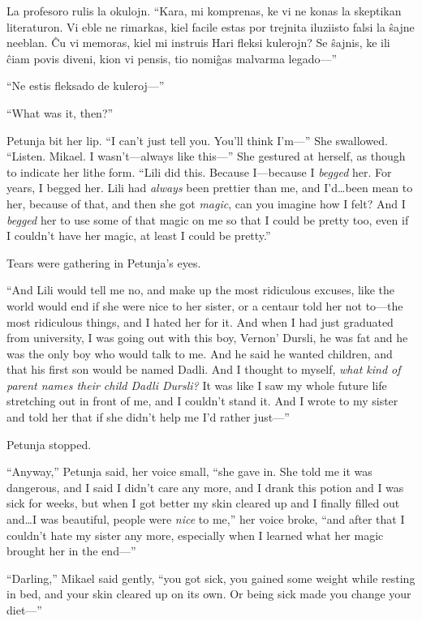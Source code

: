 La profesoro rulis la okulojn. “Kara, mi komprenas, ke vi ne konas la skeptikan literaturon. Vi eble ne rimarkas, kiel facile estas por trejnita iluziisto falsi la ŝajne neeblan. Ĉu vi memoras, kiel mi instruis Hari fleksi kulerojn? Se ŝajnis, ke ili ĉiam povis diveni, kion vi pensis, tio nomiĝas malvarma legado—”

“Ne estis fleksado de kuleroj—”

“What was it, then?”

Petunja bit her lip. “I can’t just tell you. You’ll think I’m—” She swallowed. “Listen. Mikael. I wasn’t—always like this—” She gestured at herself, as though to indicate her lithe form. “Lili did this. Because I—because I \emph{begged} her. For years, I begged her. Lili had \emph{always} been prettier than me, and I’d…been mean to her, because of that, and then she got \emph{magic}, can you imagine how I felt? And I \emph{begged} her to use some of that magic on me so that I could be pretty too, even if I couldn’t have her magic, at least I could be pretty.”

Tears were gathering in Petunja’s eyes.

“And Lili would tell me no, and make up the most ridiculous excuses, like the world would end if she were nice to her sister, or a centaur told her not to—the most ridiculous things, and I hated her for it. And when I had just graduated from university, I was going out with this boy, Vernon' Dursli, he was fat and he was the only boy who would talk to me. And he said he wanted children, and that his first son would be named Dadli. And I thought to myself, \emph{what kind of parent names their child Dadli Dursli?} It was like I saw my whole future life stretching out in front of me, and I couldn’t stand it. And I wrote to my sister and told her that if she didn’t help me I’d rather just—”

Petunja stopped.

“Anyway,” Petunja said, her voice small, “she gave in. She told me it was dangerous, and I said I didn’t care any more, and I drank this potion and I was sick for weeks, but when I got better my skin cleared up and I finally filled out and…I was beautiful, people were \emph{nice} to me,” her voice broke, “and after that I couldn’t hate my sister any more, especially when I learned what her magic brought her in the end—”

“Darling,” Mikael said gently, “you got sick, you gained some weight while resting in bed, and your skin cleared up on its own. Or being sick made you change your diet—”

